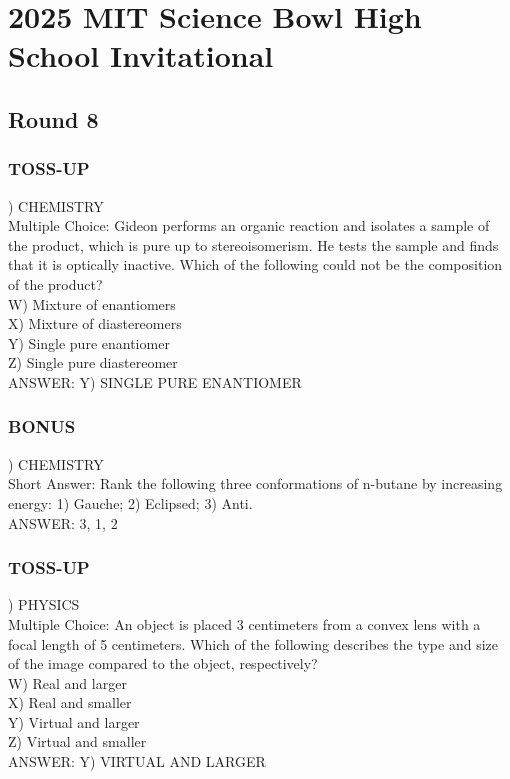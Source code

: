 \documentclass{article}
\begin{document}
\section*{2025 MIT Science Bowl High School Invitational}
\subsection*{Round 8}

\subsubsection*{TOSS-UP}
) CHEMISTRY \\
Multiple Choice: Gideon performs an organic reaction and isolates a sample of the product, which is pure up to stereoisomerism. He tests the sample and finds that it is optically inactive. Which of the following could not be the composition of the product? \\
W) Mixture of enantiomers \\
X) Mixture of diastereomers \\
Y) Single pure enantiomer \\
Z) Single pure diastereomer \\
ANSWER: Y) SINGLE PURE ENANTIOMER

\subsubsection*{BONUS}
) CHEMISTRY \\
Short Answer: Rank the following three conformations of n-butane by increasing energy: 1) Gauche; 2) Eclipsed; 3) Anti. \\
ANSWER: 3, 1, 2

\newpage

\subsubsection*{TOSS-UP}
) PHYSICS \\
Multiple Choice: An object is placed 3 centimeters from a convex lens with a focal length of 5 centimeters. Which of the following describes the type and size of the image compared to the object, respectively? \\
W) Real and larger \\
X) Real and smaller \\
Y) Virtual and larger \\
Z) Virtual and smaller \\
ANSWER: Y) VIRTUAL AND LARGER
\end{document}
